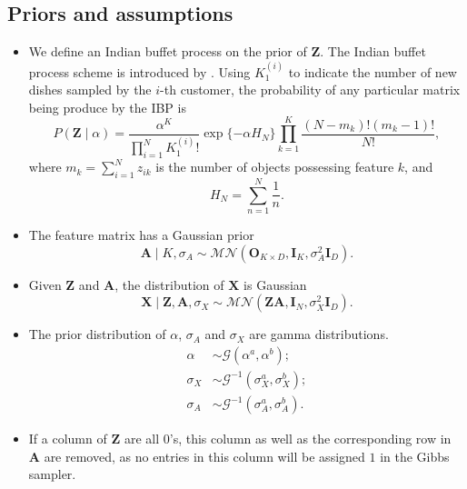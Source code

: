 \documentclass{article}
\begin{document}
\subsection{Priors and assumptions}
\begin{itemize}
  \item We define an Indian buffet process on the prior of $\mathbf{Z}$. The Indian buffet process scheme is introduced by \citet[Sec 2.4]{griffiths2005infinite}. Using $K_1^{(i)}$ to indicate the number of new dishes sampled by the $i$-th customer, the probability of any particular matrix being produce by the IBP is \begin{equation}P(\mathbf{Z}\mid\alpha) = \frac{\alpha^{K}}{\prod_{i=1}^NK_1^{(i)}!}\exp\{-\alpha H_N\}\prod_{k=1}^K\frac{(N - m_k)!(m_k - 1)!}{N!},\end{equation}
  where $m_k = \sum_{i=1}^N z_{ik}$ is the number of objects possessing feature $k$, and \begin{equation}H_N = \sum_{n = 1}^N\frac{1}{n}.\end{equation}
  \item The feature matrix has a Gaussian prior \begin{equation}\mathbf{A}\mid K, \sigma_A\sim \mathcal{MN}(\mathbf{O}_{K\times D}, \mathbf{I}_K, \sigma_A^2\mathbf{I}_D).\end{equation}
  \item Given $\mathbf{Z}$ and $\mathbf{A}$, the distribution of $\mathbf{X}$ is Gaussian \begin{equation}\mathbf{X}\mid \mathbf{Z}, \mathbf{A}, \sigma_X \sim \mathcal{MN}(\mathbf{ZA}, \mathbf{I}_N, \sigma_X^2\mathbf{I}_D).\end{equation}
  \item The prior distribution of $\alpha$, $\sigma_A$ and $\sigma_X$ are gamma distributions.
  \begin{equation}
  \begin{aligned}
    \alpha &\sim \mathcal{G}(\alpha^a, \alpha^b);\\
    \sigma_X &\sim \mathcal{G}^{-1}(\sigma_X^a,\sigma_X^b);\\
    \sigma_A &\sim \mathcal{G}^{-1}(\sigma_A^a, \sigma_A^b).
  \end{aligned}
  \end{equation}
  \item If a column of $\mathbf{Z}$ are all $0$'s, this column as well as the corresponding row in $\mathbf{A}$ are removed, as no entries in this column will be assigned $1$ in the Gibbs sampler.
\end{itemize}
\end{document}
